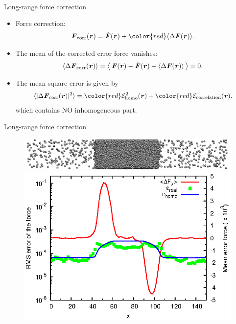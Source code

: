\documentclass{beamer}
\newcommand{\redc}[1]{{\color{red} #1}}
\newcommand{\bluec}[1]{{\color{blue} #1}}
\renewcommand{\v}[1]{\textbf{\textit{#1}}}
\begin{document}
\begin{frame}{Long-range force correction}
  \begin{itemize}\itemsep -10pt
  \item<1->   Force correction:
  \bluec{
\begin{align*}
  \v F_{\textrm{corr}}(\v r) =
  \tilde{\v F}(\v r) +
  \redc{\langle\Delta\v F(\v r)\rangle}.
\end{align*}}
\item<2->   The mean of
  the corrected error force vanishes:
  \bluec{
\begin{align*}
  \langle\Delta\v F_{\textrm{corr}}(\v r)\rangle
   =
  \big\langle\,
  \v F(\v r) - \tilde{\v F}(\v r) - \langle\Delta\v F(\v r)\rangle\,
  \big\rangle = 0.
\end{align*}}
\item<3-> The mean square error is given by
\bluec{
\begin{align*} \nonumber
  \langle\vert\Delta\v F_{\textrm{corr}}(\v r)\vert^2\rangle
   =
   \redc{\mathcal E^2_{\textrm{homo}}(\v r)} +
   \redc{\mathcal E_{\textrm{correlation}}(\v r)}.
\end{align*}}
which contains \redc{NO} inhomogeneous part.
  \end{itemize}
\end{frame}

\begin{frame}{Long-range force correction}
  \begin{figure}
    \centering
    \includegraphics[scale=1]{figs/t0.85-n16000-rc07.5uni/confout-02.eps}\\
    \includegraphics[]{figs/t0.85-n16000-fcorr-rc07.5-feq0200/fcorr-and-error.eps}
  \end{figure}
\end{frame}
\end{document}
